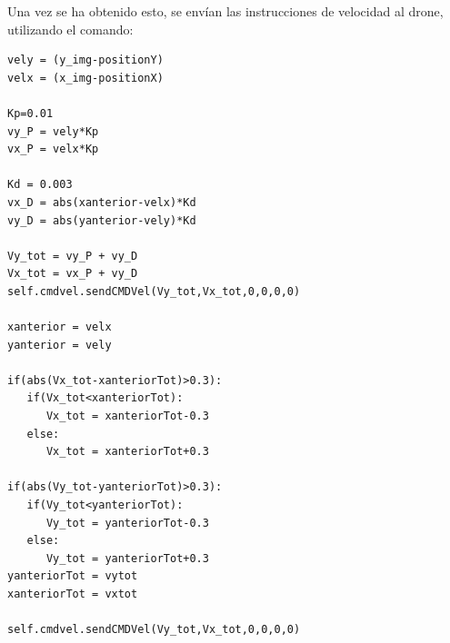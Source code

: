 \hspace{1 cm} Una vez se ha obtenido esto, se env\'ian las instrucciones de velocidad al drone, utilizando el comando:
\begin{lstlisting}[backgroundcolor=\color{yellow}]
vely = (y_img-positionY)                        
velx = (x_img-positionX)

Kp=0.01
vy_P = vely*Kp 
vx_P = velx*Kp

Kd = 0.003
vx_D = abs(xanterior-velx)*Kd
vy_D = abs(yanterior-vely)*Kd

Vy_tot = vy_P + vy_D
Vx_tot = vx_P + vy_D
self.cmdvel.sendCMDVel(Vy_tot,Vx_tot,0,0,0,0) 

xanterior = velx
yanterior = vely

if(abs(Vx_tot-xanteriorTot)>0.3):
   if(Vx_tot<xanteriorTot):
      Vx_tot = xanteriorTot-0.3
   else:
      Vx_tot = xanteriorTot+0.3                                 

if(abs(Vy_tot-yanteriorTot)>0.3):
   if(Vy_tot<yanteriorTot):
      Vy_tot = yanteriorTot-0.3
   else:
      Vy_tot = yanteriorTot+0.3                                 
yanteriorTot = vytot
xanteriorTot = vxtot

self.cmdvel.sendCMDVel(Vy_tot,Vx_tot,0,0,0,0) 
\end{lstlisting}
	





